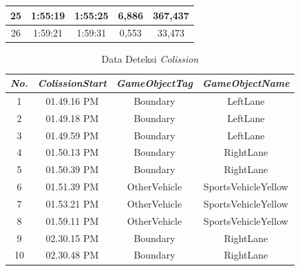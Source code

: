 \begin{table}[]
\begin{tabular}{|c|c|c|c|c|}
{\color[HTML]{000000} 25}                             & {\color[HTML]{000000} 1:55:19}                          & {\color[HTML]{000000} 1:55:25}                           & {\color[HTML]{000000} 6,886}            & {\color[HTML]{000000} 367,437}        \\ \hline
{\color[HTML]{000000} 26}                             & {\color[HTML]{000000} 1:59:21}                          & {\color[HTML]{000000} 1:59:31}                           & {\color[HTML]{000000} 0,553}            & {\color[HTML]{000000} 33,473}         \\ \hline
\end{tabular}
\end{table}

\begin{table}[]
\caption{Data Deteksi \textit{Colission}}
\label{tb:4_5}
\begin{tabular}{|c|c|c|c|}
\hline
\textit{No.} & {\color[HTML]{000000} \textit{ColissionStart}} & {\color[HTML]{000000} \textit{GameObjectTag}} & \textit{GameObjectName} \\ \hline
1            & {\color[HTML]{000000} 01.49.16 PM}             & {\color[HTML]{000000} Boundary}               & LeftLane                \\ \hline
2            & {\color[HTML]{000000} 01.49.18 PM}             & {\color[HTML]{000000} Boundary}               & LeftLane                \\ \hline
3            & {\color[HTML]{000000} 01.49.59 PM}             & {\color[HTML]{000000} Boundary}               & LeftLane                \\ \hline
4            & {\color[HTML]{000000} 01.50.13 PM}             & {\color[HTML]{000000} Boundary}               & RightLane               \\ \hline
5            & {\color[HTML]{000000} 01.50.39 PM}             & {\color[HTML]{000000} Boundary}               & RightLane               \\ \hline
6            & 01.51.39 PM                                    & OtherVehicle                                  & SportsVehicleYellow     \\ \hline
7            & 01.53.21 PM                                    & OtherVehicle                                  & SportsVehicleYellow     \\ \hline
8            & 01.59.11 PM                                    & OtherVehicle                                  & SportsVehicleYellow     \\ \hline
9            & 02.30.15 PM                                    & Boundary                                      & RightLane               \\ \hline
10           & 02.30.48 PM                                    & Boundary                                      & RightLane               \\ \hline
\end{tabular}
\end{table}

